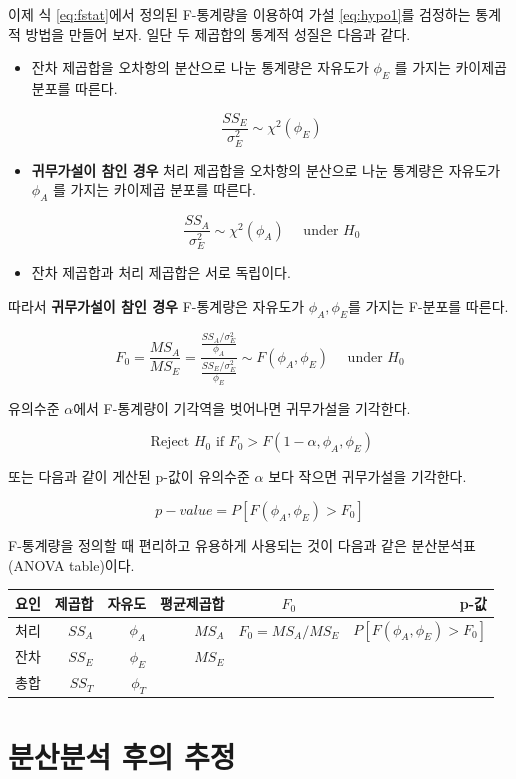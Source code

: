 \documentclass[
]{book}
\begin{document}
이제 식 \eqref{eq:fstat}에서 정의된 F-통계량을 이용하여 가설 \eqref{eq:hypo1}를 검정하는 통계적 방법을 만들어 보자. 일단 두 제곱합의 통계적 성질은 다음과 같다.

\begin{itemize}
\item
  잔차 제곱합을 오차항의 분산으로 나눈 통계량은 자유도가 \(\phi_E\) 를 가지는 카이제곱 분포를 따른다.

  \[ \frac{SS_E}{\sigma_E^2}  \sim \chi^2(\phi_E) \]
\item
  \textbf{귀무가설이 참인 경우} 처리 제곱합을 오차항의 분산으로 나눈 통계량은 자유도가 \(\phi_A\) 를 가지는 카이제곱 분포를 따른다.

  \[ \frac{SS_A}{\sigma_E^2}  \sim \chi^2(\phi_A) \quad \text{ under } H_0  \]
\item
  잔차 제곱합과 처리 제곱합은 서로 독립이다.
\end{itemize}

따라서 \textbf{귀무가설이 참인 경우} F-통계량은 자유도가 \(\phi_A, \phi_E\)를 가지는 F-분포를 따른다.

\begin{equation}
F_0 =  \frac{MS_A}{MS_E} = \frac{ \tfrac{SS_A/\sigma_E^2}{\phi_A}} {\tfrac{SS_E/\sigma_E^2}{\phi_E }}  \sim F(\phi_A, \phi_E) \quad \text{ under } H_0  
\label{eq:ftest}
\end{equation}

유의수준 \(\alpha\)에서 F-통계량이 기각역을 벗어나면 귀무가설을 기각한다.

\[ \text{ Reject } H_0 \text{ if } F_0 > F(1-\alpha, \phi_A, \phi_E)  \]

또는 다음과 같이 게산된 p-값이 유의수준 \(\alpha\) 보다 작으면 귀무가설을 기각한다.

\[ p-value = P[F(\phi_A, \phi_E) > F_0  ]   \]

F-통계량을 정의할 때 편리하고 유용하게 사용되는 것이 다음과 같은 분산분석표(ANOVA table)이다.

\begin{longtable}[]{@{}crrrcr@{}}
\toprule
요인 & 제곱합 & 자유도 & 평균제곱합 & \(F_0\) & p-값\tabularnewline
\midrule
\endhead
처리 & \(SS_A\) & \(\phi_A\) & \(MS_A\) & \(F_0=MS_A/MS_E\) & \(P[F(\phi_A, \phi_E) > F_0 ]\)\tabularnewline
잔차 & \(SS_E\) & \(\phi_E\) & \(MS_E\) & &\tabularnewline
총합 & \(SS_T\) & \(\phi_T\) & & &\tabularnewline
\bottomrule
\end{longtable}

\hypertarget{uxbd84uxc0b0uxbd84uxc11d-uxd6c4uxc758-uxcd94uxc815}{%
\section{분산분석 후의 추정}\label{uxbd84uxc0b0uxbd84uxc11d-uxd6c4uxc758-uxcd94uxc815}}
\end{document}
